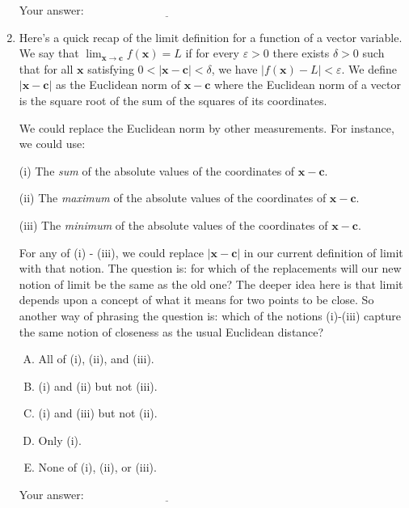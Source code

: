 \documentclass[10pt]{amsart}
\begin{document}
\begin{enumerate}
  \vspace{0.1in}
  Your answer: $\underline{\qquad\qquad\qquad\qquad\qquad\qquad\qquad}$
  \vspace{0.1in}

\item Here's a quick recap of the limit definition for a function of a
  vector variable. We say that $\displaystyle \lim_{\mathbf{x} \to \mathbf{c}}
  f(\mathbf{x}) = L$ if for every $\varepsilon > 0$ there exists
  $\delta > 0$ such that for all $\mathbf{x}$ satisfying $0 <
  |\mathbf{x} - \mathbf{c}| < \delta$, we have $|f(\mathbf{x}) - L| <
  \varepsilon$. We define $|\mathbf{x} - \mathbf{c}|$ as the Euclidean
  norm of $\mathbf{x} - \mathbf{c}$ where the Euclidean norm of a
  vector is the square root of the sum of the squares of its
  coordinates.

  We could replace the Euclidean norm by other measurements. For instance, we could use:

  (i) The {\em sum} of the absolute values of the coordinates of
  $\mathbf{x} - \mathbf{c}$.

  (ii) The {\em maximum} of the absolute values of the coordinates of
  $\mathbf{x} - \mathbf{c}$.

  (iii) The {\em minimum} of the absolute values of the coordinates of
  $\mathbf{x} - \mathbf{c}$.

  For any of (i) - (iii), we could replace $|\mathbf{x} - \mathbf{c}|$
  in our current definition of limit with that notion. The question
  is: for which of the replacements will our new notion of limit be
  the same as the old one? The deeper idea here is that limit depends
  upon a concept of what it means for two points to be close. So
  another way of phrasing the question is: which of the notions
  (i)-(iii) capture the same notion of closeness as the usual
  Euclidean distance?

  \begin{enumerate}[(A)]
  \item All of (i), (ii), and (iii).
  \item (i) and (ii) but not (iii).
  \item (i) and (iii) but not (ii).
  \item Only (i).
  \item None of (i), (ii), or (iii).
  \end{enumerate}

  \vspace{0.1in}
  Your answer: $\underline{\qquad\qquad\qquad\qquad\qquad\qquad\qquad}$
  \vspace{0.1in}


\end{enumerate}
\end{document}
